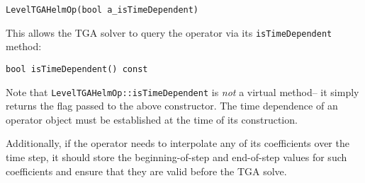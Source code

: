 \begin{verbatim}
LevelTGAHelmOp(bool a_isTimeDependent)
\end{verbatim}

\noindent
This allows the TGA solver to query the operator via its {\tt isTimeDependent} 
method:

\begin{verbatim}
bool isTimeDependent() const
\end{verbatim}

\noindent
Note that {\tt LevelTGAHelmOp::isTimeDependent} is {\em not} a virtual method--
it simply returns the flag passed to the above constructor. The time dependence 
of an operator object must be established at the time of its construction.

Additionally, if the operator needs to interpolate any of its coefficients 
over the time step, it should store the beginning-of-step and end-of-step 
values for such coefficients and ensure that they are valid before the 
TGA solve.

